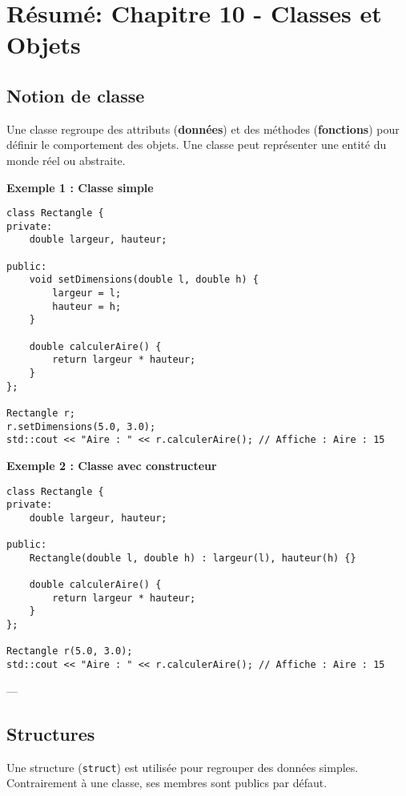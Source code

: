 \section{Résumé: Chapitre 10 - Classes et Objets}

\subsection{ Notion de classe}
Une classe regroupe des attributs (\textbf{données}) et des méthodes (\textbf{fonctions}) pour définir le comportement des objets. Une classe peut représenter une entité du monde réel ou abstraite.

\textbf{Exemple 1 : Classe simple}
\begin{tcolorbox}[colframe=blue!50!black, colback=blue!5!white, title=Exemple d'Attributs et Méthodes Statistiques, float=htb]
\begin{verbatim}
class Rectangle {
private:
    double largeur, hauteur;

public:
    void setDimensions(double l, double h) {
        largeur = l;
        hauteur = h;
    }

    double calculerAire() {
        return largeur * hauteur;
    }
};

Rectangle r;
r.setDimensions(5.0, 3.0);
std::cout << "Aire : " << r.calculerAire(); // Affiche : Aire : 15
\end{verbatim}
\end{tcolorbox}
\textbf{Exemple 2 : Classe avec constructeur}
\begin{tcolorbox}[colframe=blue!50!black, colback=blue!5!white, title=Exemple d'Attributs et Méthodes Statistiques, float=htb]
\begin{verbatim}
class Rectangle {
private:
    double largeur, hauteur;

public:
    Rectangle(double l, double h) : largeur(l), hauteur(h) {}

    double calculerAire() {
        return largeur * hauteur;
    }
};

Rectangle r(5.0, 3.0);
std::cout << "Aire : " << r.calculerAire(); // Affiche : Aire : 15
\end{verbatim}
\end{tcolorbox}
---

\subsection{ Structures}
Une structure (\texttt{struct}) est utilisée pour regrouper des données simples. Contrairement à une classe, ses membres sont publics par défaut.

